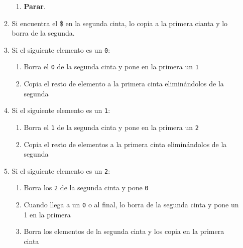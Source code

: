 \begin{itemize}
\begin{enumerate}
\begin{enumerate}[1.]
            \item \textbf{Parar}.
        \end{enumerate}
        \item Si encuentra el \$ en la segunda cinta, lo copia a la primera cianta y lo borra de la segunda.
        \item Si el siguiente elemento es un \texttt{0}:
        \begin{enumerate}[1.]
            \item Borra el \texttt{0} de la segunda cinta y pone en la primera un \texttt{1}
            \item Copia el resto de elemento a la primera cinta eliminándolos de la segunda
        \end{enumerate}
        \item Si el siguiente elemento es un \texttt{1}:
        \begin{enumerate}[1.]
            \item Borra el \texttt{1} de la segunda cinta y pone en la primera un \texttt{2}
            \item Copia el resto de elementos a la primera cinta eliminándolos de la segunda
        \end{enumerate}
        \item Si el siguiente elemento es un \texttt{2}:
        \begin{enumerate}[1.]
            \item Borra los \texttt{2} de la segunda cinta y pone \texttt{0}
            \item Cuando llega a un \texttt{0} o al final, lo borra de la segunda cinta y pone un 1 en la primera
            \item Borra los elementos de la segunda cinta y los copia en la primera cinta
        \end{enumerate}
    \end{enumerate}
\end{itemize}




